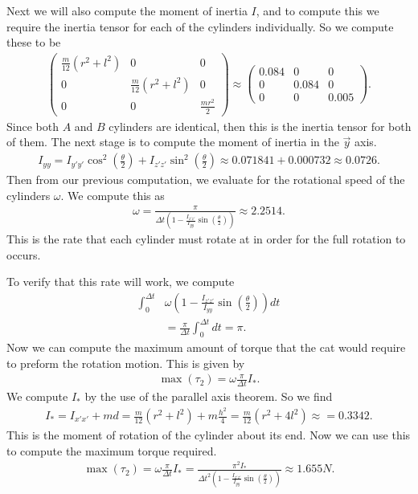 \documentclass[12]{amsart}
\theoremstyle{definition}
\begin{document}
Next we will also compute the moment of inertia $I$, and to compute this
we require the inertia tensor for each of the cylinders individually. So we
compute these to be
\begin{align*}
  \begin{pmatrix}
    \frac{m}{12}\left(r^2+l^2\right) & 0 & 0\\
    0 & \frac{m}{12}\left(r^2+l^2\right) & 0\\
    0 & 0 & \frac{mr^2}{2}
  \end{pmatrix}\approx
  \begin{pmatrix}
    0.084 & 0 & 0\\
    0 & 0.084 & 0\\
    0 & 0 & 0.005
  \end{pmatrix}.
\end{align*}
Since both $A$ and $B$ cylinders are identical, then this is the inertia tensor
for both of them. The next stage is to compute the moment of inertia in the
$\vec{y}$ axis.
\begin{align*}
  I_{yy}=I_{y'y'}\cos^2\left(\frac{\theta}{2}\right)+I_{z'z'}\sin^2\left(\frac{\theta}{2}\right)\approx0.071841+0.000732\approx0.0726.
\end{align*}
Then from our previous computation, we evaluate for the rotational speed of the
cylinders $\omega$. We compute this as
\begin{align*}
  \omega=\frac{\pi}{\Delta
    t\left(1-\frac{I_{z'z'}}{I_{yy}}\sin\left(\frac{\theta}{2}\right)\right)}\approx2.2514.
\end{align*}
This is the rate that each cylinder must rotate at in order for the full
rotation to occurs.

To verify that this rate will work, we compute
\begin{align*}
  \int_0^{\Delta
    t}&\omega\left(1-\frac{I_{z'z'}}{I_{yy}}\sin\left(\frac{\theta}{2}\right)\right)dt\\
  &=\frac{\pi}{\Delta t}\int_{0}^{\Delta t}dt=\pi.
\end{align*}
Now we can compute the maximum amount of torque that the cat would require to
preform the rotation motion. This is given by
\begin{align*}
  \max(\tau_2)=\omega\frac{\pi}{\Delta t}I_*.
\end{align*}
We compute $I_*$ by the use of the parallel axis theorem. So we find
\begin{align*}
  I_*=I_{x'x'}+md=\frac{m}{12}\left(r^2+l^2\right)+m\frac{h^2}{4}=\frac{m}{12}\left(r^2+4l^2\right)\approx=0.3342.
\end{align*}
This is the moment of rotation of the cylinder about its end. Now we can use
this to compute the maximum torque required.
\begin{align*}
  \max(\tau_2)=\omega\frac{\pi}{\Delta t}I_*=\frac{\pi^2I_*}{\Delta
    t^2\left(1-\frac{I_{z'z'}}{I_{yy}}\sin\left(\frac{\theta}{2}\right)\right)}\approx1.655N.
\end{align*}
\end{document}
